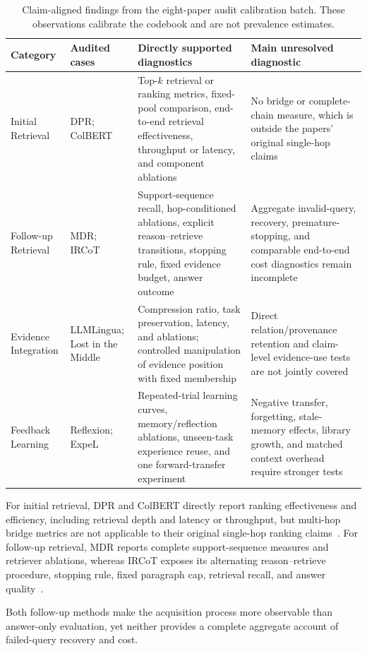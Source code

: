 \begin{table}[tbp]
\centering
\caption{Claim-aligned findings from the eight-paper audit calibration batch. These observations calibrate the codebook and are not prevalence estimates.}
\label{tab:audit_pilot}
\footnotesize
\begin{tabularx}{\textwidth}{@{}p{2.45cm}p{3.15cm}Y Y@{}}
\toprule
Category & Audited cases & Directly supported diagnostics & Main unresolved diagnostic \\
\midrule
Initial Retrieval & DPR; ColBERT & Top-$k$ retrieval or ranking metrics, fixed-pool comparison, end-to-end retrieval effectiveness, throughput or latency, and component ablations & No bridge or complete-chain measure, which is outside the papers' original single-hop claims \\
Follow-up Retrieval & MDR; IRCoT & Support-sequence recall, hop-conditioned ablations, explicit reason--retrieve transitions, stopping rule, fixed evidence budget, answer outcome & Aggregate invalid-query, recovery, premature-stopping, and comparable end-to-end cost diagnostics remain incomplete \\
Evidence Integration & LLMLingua; Lost in the Middle & Compression ratio, task preservation, latency, and ablations; controlled manipulation of evidence position with fixed membership & Direct relation/provenance retention and claim-level evidence-use tests are not jointly covered \\
Feedback Learning & Reflexion; ExpeL & Repeated-trial learning curves, memory/reflection ablations, unseen-task experience reuse, and one forward-transfer experiment & Negative transfer, forgetting, stale-memory effects, library growth, and matched context overhead require stronger tests \\
\bottomrule
\end{tabularx}
\end{table}

For initial retrieval, DPR and ColBERT directly report ranking effectiveness and efficiency, including retrieval depth and latency or throughput, but multi-hop bridge metrics are not applicable to their original single-hop ranking claims~\cite{karpukhin2020dpr,khattab2020colbert}. For follow-up retrieval, MDR reports complete support-sequence measures and retriever ablations, whereas IRCoT exposes its alternating reason--retrieve procedure, stopping rule, fixed paragraph cap, retrieval recall, and answer quality~\cite{xiong2021mdr,trivedi2023ircot}.

Both follow-up methods make the acquisition process more observable than answer-only evaluation, yet neither provides a complete aggregate account of failed-query recovery and cost.


